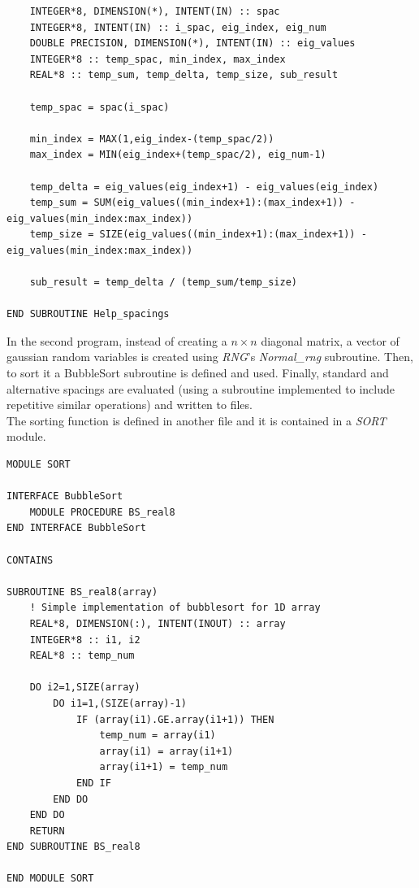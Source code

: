\documentclass[12pt, a4paper, notitlepage]{report}
\begin{document}
\begin{lstlisting}
	INTEGER*8, DIMENSION(*), INTENT(IN) :: spac
	INTEGER*8, INTENT(IN) :: i_spac, eig_index, eig_num
	DOUBLE PRECISION, DIMENSION(*), INTENT(IN) :: eig_values
	INTEGER*8 :: temp_spac, min_index, max_index
	REAL*8 :: temp_sum, temp_delta, temp_size, sub_result
	
	temp_spac = spac(i_spac)
	
	min_index = MAX(1,eig_index-(temp_spac/2))
	max_index = MIN(eig_index+(temp_spac/2), eig_num-1)
	
	temp_delta = eig_values(eig_index+1) - eig_values(eig_index)
	temp_sum = SUM(eig_values((min_index+1):(max_index+1)) - eig_values(min_index:max_index))
	temp_size = SIZE(eig_values((min_index+1):(max_index+1)) - eig_values(min_index:max_index))
	
	sub_result = temp_delta / (temp_sum/temp_size)

END SUBROUTINE Help_spacings
\end{lstlisting}

\vspace{0.5cm}

In the second program, instead of creating a $n \times n$ diagonal matrix, a vector of gaussian random variables is created using \textit{RNG}'s \textit{Normal\_rng} subroutine. Then, to sort it a BubbleSort subroutine is defined and used. Finally, standard and alternative spacings are evaluated (using a subroutine implemented to include repetitive similar operations) and written to files.\\

The sorting function is defined in another file and it is contained in a \textit{SORT} module.

\begin{lstlisting}
MODULE SORT

INTERFACE BubbleSort
	MODULE PROCEDURE BS_real8
END INTERFACE BubbleSort

CONTAINS

SUBROUTINE BS_real8(array)
	! Simple implementation of bubblesort for 1D array
	REAL*8, DIMENSION(:), INTENT(INOUT) :: array
	INTEGER*8 :: i1, i2
	REAL*8 :: temp_num
	
	DO i2=1,SIZE(array)
		DO i1=1,(SIZE(array)-1)
			IF (array(i1).GE.array(i1+1)) THEN
				temp_num = array(i1)
				array(i1) = array(i1+1)
				array(i1+1) = temp_num
			END IF
		END DO
	END DO
	RETURN
END SUBROUTINE BS_real8

END MODULE SORT
\end{lstlisting}

\newpage
\end{document}
